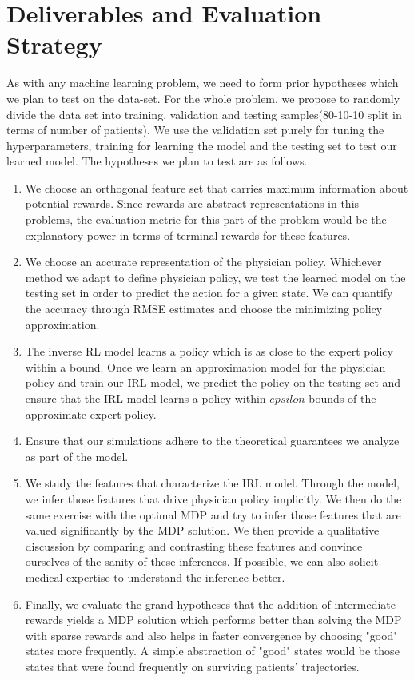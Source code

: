 \documentclass[twoside,11pt]{article}
\begin{document}
\section{Deliverables and Evaluation Strategy}
As with any machine learning problem, we need to form prior hypotheses which we plan to test on the data-set. For the whole problem, we propose to randomly divide the data set into training, validation and testing samples(80-10-10 split in terms of number of patients). We use the validation set purely for tuning the hyperparameters, training for learning the model and the testing set to test our learned model. The hypotheses we plan to test are as follows.
\begin{enumerate}
\item We choose an orthogonal feature set that carries maximum information about potential rewards. Since rewards are abstract representations in this problems, the evaluation metric for this part of the problem would be the explanatory power in terms of terminal rewards for these features.
\item We choose an accurate representation of the physician policy. Whichever method we adapt to define physician policy, we test the learned model on the testing set in order to predict the action for a given state. We can quantify the accuracy through RMSE estimates and choose the minimizing policy approximation.
\item The inverse RL model learns a policy which is as close to the expert policy within a bound. Once we learn an approximation model for the physician policy and train our IRL model, we predict the policy on the testing set and ensure that the IRL model learns a policy within $epsilon$ bounds of the approximate expert policy.
\item Ensure that our simulations adhere to the theoretical guarantees we analyze as part of the model.
\item We study the features that characterize the IRL model. Through the model, we infer those features that drive physician policy implicitly. We then do the same exercise with the optimal MDP and try to infer those features that are valued significantly by the MDP solution. We then provide a qualitative discussion by comparing and contrasting these features and convince ourselves of the sanity of these inferences. If possible, we can also solicit medical expertise to understand the inference better.
\item Finally, we evaluate the grand hypotheses that the addition of intermediate rewards yields a MDP solution which performs better than solving the MDP with sparse rewards and also helps in faster convergence by choosing "good" states more frequently. A simple abstraction of "good" states would be those states that were found frequently on surviving patients' trajectories.
\end{enumerate} 
\end{document}
